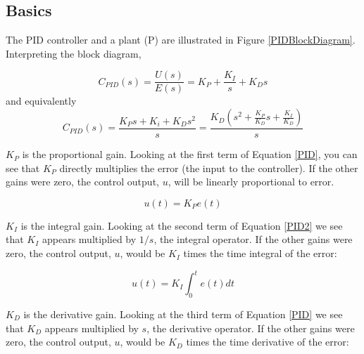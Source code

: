 \subsection{Basics}


The PID controller and a  plant (P) are illustrated in Figure \ref{PIDBlockDiagram}. Interpreting the block diagram,

\begin{equation}\label{PID}
C_{PID}(s) = \frac{U(s)}{E(s)} = K_P + \frac{K_I}{s} + K_Ds
\end{equation}
and equivalently
\begin{equation}\label{PID2}
C_{PID}(s) =  \frac{K_Ps+K_i + K_Ds^2}{s} = \frac{K_D(s^2 + \frac{K_P}{K_D}s + \frac{K_I}{K_D})}{s}
\end{equation}




{\bf $K_P$}  is the proportional gain.
Looking at the first term of Equation \ref{PID}, you can see that $K_P$ directly multiplies the error (the input to the controller).  If the other gains were zero, the control output, $u$, will be  linearly proportional to error.	%

\[
u(t) = K_P e(t)
\]




{\bf $K_I$} is the integral gain.
Looking at the second term of Equation \ref{PID2} we see that $K_I$ appears multiplied by $1/s$, the integral operator.  If the other gains were zero, the control output, $u$, would be $K_I$ times the time integral of the error:	%

\[
u(t) = K_I \int_0^t e(t) dt
\]






{\bf $K_D$} is the derivative gain.
Looking at the third term of Equation \ref{PID} we see that $K_D$ appears multiplied by $s$, the derivative operator.  If the other gains were zero, the control output, $u$, would be $K_D$ times the time derivative of the error:	%

